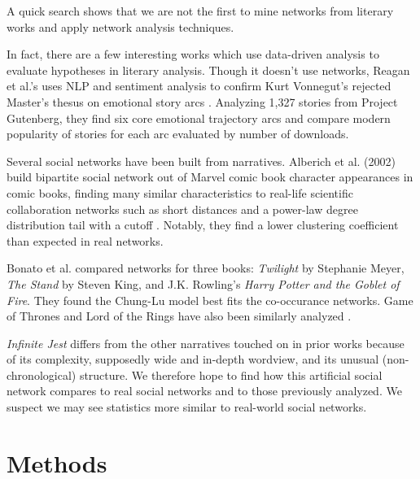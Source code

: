 \documentclass[sigconf]{acmart}
\newcommand{\infinitejest}{{\em Infinite Jest}\xspace}
\begin{document}
A quick search shows that we are not the first to mine networks from literary works and apply network analysis techniques.

In fact, there are a few interesting works which use data-driven analysis to evaluate hypotheses in literary analysis. 
Though it doesn't use networks, Reagan et al.'s uses NLP and sentiment analysis to confirm Kurt Vonnegut's rejected Master's thesus on emotional story arcs \cite{Reagan2016}. 
Analyzing 1,327 stories from Project Gutenberg, they find six core emotional trajectory arcs and compare modern popularity of stories for each arc evaluated by number of downloads.

Several social networks have been built from narratives. 
Alberich et al. (2002) build bipartite social network out of Marvel comic book character appearances in comic books, finding many similar characteristics to real-life scientific collaboration networks such as short distances and a power-law degree distribution tail with a cutoff \cite{2002marvel}. Notably, they find a lower clustering coefficient than expected in real networks.

Bonato et al. \cite{Bonato2016} compared networks for three books: {\em Twilight} by Stephanie Meyer, {\em The Stand} by Steven King, and J.K. Rowling's {\em Harry Potter and the Goblet of Fire}. 
They found the Chung-Lu model best fits the co-occurance networks.
Game of Thrones and Lord of the Rings have also been similarly analyzed \cite{GOT,ribeiro2016complex}.


\infinitejest differs from the other narratives touched on in prior works because of its complexity, supposedly wide and in-depth wordview, and its unusual (non-chronological) structure. We therefore hope to find how this artificial social network compares to real social networks and to those previously analyzed. We suspect we may see statistics more similar to real-world social networks.

\section{Methods}
\end{document}
